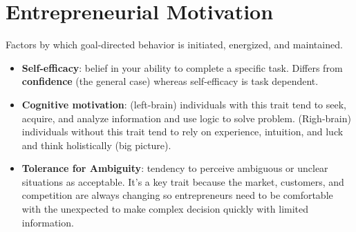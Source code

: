 \documentclass{article}
\begin{document}
  \section{Entrepreneurial Motivation}
  Factors by which goal-directed behavior is initiated, energized, and maintained.
  \begin{itemize}
    \item \textbf{Self-efficacy}: belief in your ability to complete a specific task. Differs from \textbf{confidence} (the general case) whereas self-efficacy is task dependent.
    \item \textbf{Cognitive motivation}: (left-brain) individuals with this trait tend to seek, acquire, and analyze information and use logic to solve problem. (Righ-brain) individuals without this trait tend to rely on experience, intuition, and luck and think holistically (big picture).
    \item \textbf{Tolerance for Ambiguity}: tendency to perceive ambiguous or unclear situations as acceptable. It's a key trait because the market, customers, and competition are always changing so entrepreneurs need to be comfortable with the unexpected to make complex decision quickly with limited information.
  \end{itemize}
\end{document}
